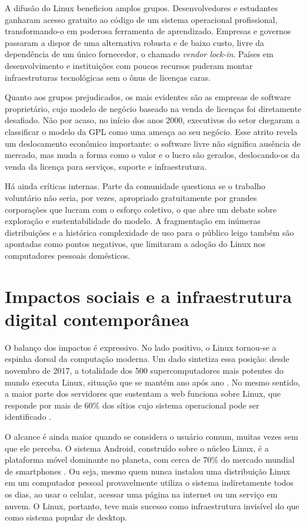 \documentclass[12pt]{article}
\begin{document}
A difusão do Linux beneficiou amplos grupos. Desenvolvedores e estudantes
ganharam acesso gratuito ao código de um sistema operacional profissional,
transformando-o em poderosa ferramenta de aprendizado. Empresas e governos
passaram a dispor de uma alternativa robusta e de baixo custo, livre da
dependência de um único fornecedor, o chamado \textit{vendor lock-in}. Países em
desenvolvimento e instituições com poucos recursos puderam montar
infraestruturas tecnológicas sem o ônus de licenças caras.

Quanto aos grupos prejudicados, os mais evidentes são as empresas de software
proprietário, cujo modelo de negócio baseado na venda de licenças foi diretamente
desafiado. Não por acaso, no início dos anos 2000, executivos do setor chegaram a
classificar o modelo da GPL como uma ameaça ao seu negócio. Esse atrito revela um
deslocamento econômico importante: o software livre não significa ausência de
mercado, mas muda a forma como o valor e o lucro são gerados, deslocando-os da
venda da licença para serviços, suporte e infraestrutura.

Há ainda críticas internas. Parte da comunidade questiona se o trabalho
voluntário não seria, por vezes, apropriado gratuitamente por grandes
corporações que lucram com o esforço coletivo, o que abre um debate sobre
exploração e sustentabilidade do modelo. A fragmentação em inúmeras
distribuições e a histórica complexidade de uso para o público leigo também são
apontadas como pontos negativos, que limitaram a adoção do Linux nos
computadores pessoais domésticos.

\section{Impactos sociais e a infraestrutura digital contemporânea}

O balanço dos impactos é expressivo. No lado positivo, o Linux tornou-se a
espinha dorsal da computação moderna. Um dado sintetiza essa posição: desde
novembro de 2017, a totalidade dos 500 supercomputadores mais potentes do mundo
executa Linux, situação que se mantém ano após ano \cite{top500,lf_super}. No
mesmo sentido, a maior parte dos servidores que sustentam a web funciona sobre
Linux, que responde por mais de 60\% dos sítios cujo sistema operacional pode ser
identificado \cite{w3techs}.

O alcance é ainda maior quando se considera o usuário comum, muitas vezes sem que
ele perceba. O sistema Android, construído sobre o núcleo Linux, é a plataforma
móvel dominante no planeta, com cerca de 70\% do mercado mundial de smartphones
\cite{statcounter_mobile,android_kernel}. Ou seja, mesmo quem nunca instalou uma
distribuição Linux em um computador pessoal provavelmente utiliza o sistema
indiretamente todos os dias, ao usar o celular, acessar uma página na internet ou
um serviço em nuvem. O Linux, portanto, teve mais sucesso como infraestrutura
invisível do que como sistema popular de desktop.
\end{document}
